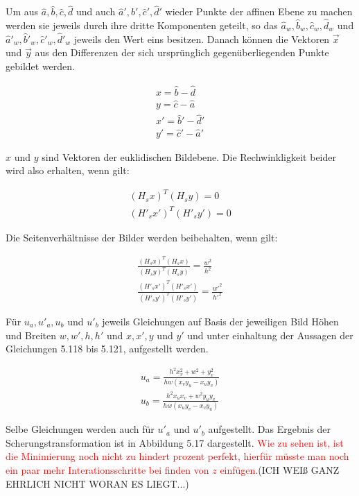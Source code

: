 Um aus $\hat{a},\hat{b},\hat{c},\hat{d}$ und auch $\hat{a}',\hat{b}',\hat{c}',\hat{d}'$ wieder Punkte der affinen Ebene zu machen werden sie jeweils durch ihre dritte Komponenten geteilt, so das $\hat{a}_w,\hat{b}_w,\hat{c}_w,\hat{d}_w$ und $\hat{a}'_w,\hat{b}'_w,\hat{c}'_w,\hat{d}'_w$ jeweils den Wert eins besitzen. Danach können die Vektoren $\vec{x}$ und $\vec{y}$ aus den Differenzen der sich ursprünglich gegenüberliegenden Punkte gebildet werden.

\begin{gather}
	x = \hat{b}-\hat{d}\\
	y = \hat{c}-\hat{a}\\
	x' = \hat{b}'-\hat{d}'\\
	y' = \hat{c}'-\hat{a}'
\end{gather}

$x$ und $y$ sind Vektoren der euklidischen Bildebene. Die Rechwinkligkeit beider wird also erhalten, wenn gilt:

\begin{gather}
	(H_sx)^T(H_sy)= 0 \\
	(H'_sx')^T(H'_sy')= 0 
\end{gather}

Die Seitenverhältnisse der Bilder werden beibehalten, wenn gilt:

\begin{gather}
	\frac{(H_sx)^T(H_sx)}{(H_sy)^T(H_sy)} = \frac{w^2}{h^2}\\
	\frac{(H'_sx')^T(H'_sx')}{(H'_sy')^T(H'_sy')} = \frac{w'^2}{h'^2}	
\end{gather}

Für $u_a, u'_a, u_b$ und $u'_b$ jeweils Gleichungen auf Basis der jeweiligen Bild Höhen und Breiten $w,w',h,h'$ und $x,x',y$ und $y'$ und unter einhaltung der Aussagen der Gleichungen 5.118 bis 5.121, aufgestellt werden\cite{ZZ,ACM}. 

\begin{gather}
	u_a = \frac{h^2x_v^2+w^2+y_v^2}{hw(x_vy_u-x_uy_v)}\\
	u_b = \frac{h^2x_ux_v+w^2y_uy_v}{hw(x_uy_v-x_vy_u)}
\end{gather}

Selbe Gleichungen werden auch für $u'_a$ und $u'_b$ aufgestellt. Das Ergebnis der Scherungstransformation ist in Abbildung 5.17 dargestellt. \textcolor{red}{ Wie zu sehen ist, ist die Minimierung noch nicht zu hindert prozent perfekt, hierfür müsste man noch ein paar mehr Interationsschritte bei finden von $z$ einfügen.}(ICH WEIß GANZ EHRLICH NICHT WORAN ES LIEGT...)



